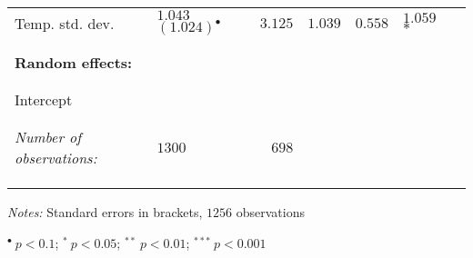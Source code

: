\documentclass[a4paper,12pt]{article}
\begin{document}
{\begin{threeparttable}
\begin{footnotesize}
\begin{tabular}{llrllll}
          \vspace{-0.2cm}Temp. std. dev.&$1.043$ $(1.024)^{\bullet}$&$3.125$&$1.039$&$0.558$&$1.059$ ${*}$&\\
  \\

  \hline
\vspace{-0.2cm} \\
  \multicolumn{1}{l}{\textbf{Random effects:}}  & \\
\vspace{-0.2cm}
\\
\hline
\\
  \vspace{-0.2cm}Intercept\\
 \\ 
 \hline
\vspace{-0.2cm} \\
\textit{Number of observations:}  &$1300$&$698$& \\
\vspace{-0.2cm}
\\  
  
  \hline
  \vspace{-0.2cm} \\

\hline
\vspace{-0.2cm}
\end{tabular} 
\end{footnotesize}
 \begin{tablenotes}
  \begin{footnotesize}
    \item \textit{Notes:} Standard errors in brackets, \hspace{0.05cm}$1256$ observations
        \begin{adjustwidth}{1cm}{} 
    \item \hspace{0.45cm}$^{\bullet}~p<0.1$; $^{*}~p<0.05$; $^{**}~p<0.01$; $^{***}~p<0.001$
     \end{adjustwidth}
\singlespacing
  \end{footnotesize}
\end{tablenotes}
  \end{threeparttable} 
\par}
\linespread{1}

\pagebreak
\end{document}
